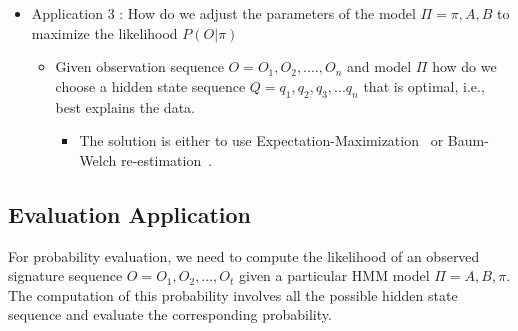 \begin{itemize}
\item Application 3 : How do we adjust the parameters of the model $\Pi = {\pi, A, B}$ to maximize the likelihood $P(O|\pi)$ 
 \begin{itemize}
 \item Given observation sequence $O = {O_1, O_2,....,}O_n$ and model $\Pi$ how do we choose a hidden state sequence $Q={q_1,q_2,q_3,...q_n}$
that is optimal, i.e., best explains the data. 
  \begin{itemize}
  \item The solution is either to use Expectation-Maximization~\cite{moon1996expectation} or Baum-Welch re-estimation~\cite{leggetter1995maximum}.
  \end{itemize}
 \end{itemize}
\end{itemize}









\subsection{Evaluation Application}

For probability evaluation, we need to compute the likelihood of an observed signature sequence $O = {O_1, O_2,...,O_t}$ given a particular HMM model $ \Pi = {A, B, \pi}$. The computation of this probability involves all the possible hidden state sequence and evaluate the corresponding probability. 

